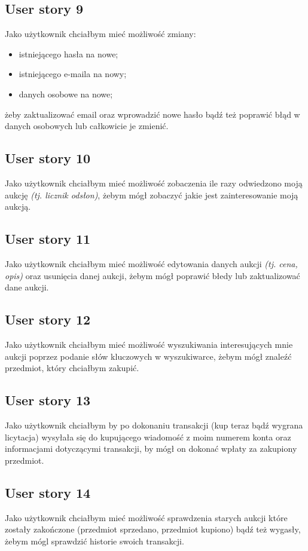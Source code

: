 \documentclass[a4paper]{article}
\begin{document}
	\subsection{User story 9}
	Jako użytkownik chciałbym mieć możliwość zmiany:
	\begin{itemize}
		\item istniejącego  hasła na nowe;
		\item istniejącego e-maila na nowy;
		\item danych osobowe na nowe;
	\end{itemize}
	żeby zaktualizować email oraz wprowadzić nowe hasło bądź też poprawić błąd w danych osobowych lub całkowicie je zmienić.
	
	\subsection{User story 10}
	Jako użytkownik chciałbym mieć możliwość zobaczenia ile razy odwiedzono moją aukcję \emph{ (tj. licznik odsłon)}, żebym mógł zobaczyć jakie jest zainteresowanie moją aukcją.
	
	\subsection{User story 11}
	Jako użytkownik chciałbym mieć możliwość edytowania danych aukcji \emph{ (tj. cena, opis)} oraz usunięcia danej aukcji, żebym mógł poprawić błedy lub zaktualizować dane aukcji.
	
	\subsection{User story 12}
	Jako użytkownik chciałbym mieć możliwość wyszukiwania interesujących mnie aukcji poprzez podanie słów kluczowych w wyszukiwarce, żebym mógł znaleźć przedmiot, który chciałbym zakupić.
	
	\subsection{User story 13}
	Jako użytkownik chciałbym by po dokonaniu transakcji (kup teraz bądź wygrana licytacja) wysyłała się do kupującego wiadomość z moim numerem konta oraz informacjami dotyczącymi transakcji, by mógł on dokonać wpłaty za zakupiony przedmiot.
	
	\subsection{User story 14}
	Jako użytkownik chciałbym mieć możliwość sprawdzenia starych aukcji które zostały zakończone (przedmiot sprzedano, przedmiot kupiono) bądź też wygasły, żebym mógl sprawdzić historie swoich transakcji.
	 
\end{document}
